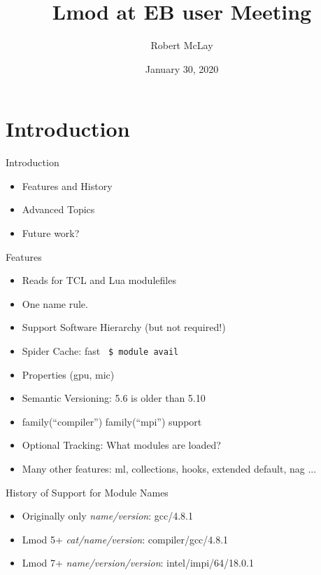 \documentclass{beamer}
\begin{document}
\title[Lmod]{Lmod at EB user Meeting}
\author{Robert McLay} 
\date{January 30, 2020} 

\frame{\titlepage} 

\section{Introduction}

\begin{frame}{Introduction}
  \begin{itemize}
    \item Features and History
    \item Advanced Topics
    \item Future work?
  \end{itemize}
\end{frame}

\begin{frame}{Features}
  \begin{itemize}
    \item Reads for TCL and Lua modulefiles
    \item One name rule.
    \item Support Software Hierarchy (but not required!)
    \item Spider Cache: fast \texttt{\color{blue} \$ module avail}
    \item Properties (gpu, mic)
    \item Semantic Versioning:  5.6 is older than 5.10
    \item family(``compiler'') family(``mpi'') support
    \item Optional Tracking: What modules are loaded?
    \item Many other features: ml, collections, hooks,
      extended default, nag ...
  \end{itemize}
\end{frame}

\begin{frame}{History of Support for Module Names}
  \begin{itemize}
    \item Originally only \emph{name/version}:  gcc/4.8.1
    \item Lmod 5+ \emph{cat/name/version}:  compiler/gcc/4.8.1
    \item Lmod 7+ \emph{name/version/version}: intel/impi/64/18.0.1
  \end{itemize}
\end{frame}
\end{document}
